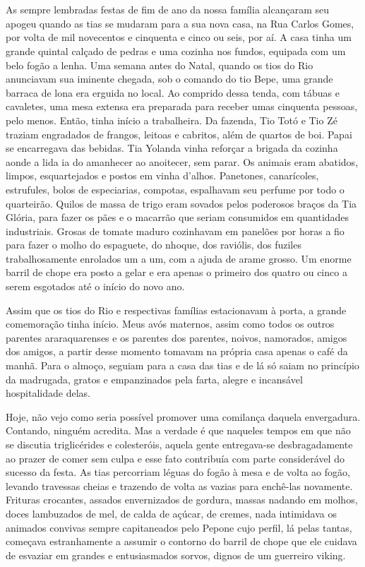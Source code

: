 \chapter{}
As sempre lembradas festas de fim de ano da nossa família alcançaram seu apogeu quando as tias se mudaram para a sua nova casa, na Rua Carlos Gomes, por volta de mil novecentos e cinquenta e cinco ou seis, por aí.
A casa tinha um grande quintal calçado de pedras e uma cozinha nos fundos, equipada com um belo fogão a lenha.
Uma semana antes do Natal, quando os tios do Rio anunciavam sua iminente chegada, sob o comando do tio Bepe, uma grande barraca de lona era erguida no local.
Ao comprido dessa tenda, com tábuas e cavaletes, uma mesa extensa era preparada para receber umas cinquenta pessoas, pelo menos.
Então, tinha início a trabalheira.
Da fazenda, Tio Totó e Tio Zé traziam engradados de frangos, leitoas e cabritos, além de quartos de boi.
Papai se encarregava das bebidas.
Tia Yolanda vinha reforçar a brigada da cozinha aonde a lida ia do amanhecer ao anoitecer, sem parar.
Os animais eram abatidos, limpos, esquartejados e postos em vinha d’alhos.
Panetones, canarícoles, estrufules, bolos de especiarias, compotas, espalhavam seu perfume por todo o quarteirão.
Quilos de massa de trigo eram sovados pelos poderosos braços da Tia Glória, para fazer os pães e o macarrão que seriam consumidos em quantidades industriais.
Grosas de tomate maduro cozinhavam em panelões por horas a fio para fazer o molho do espaguete, do nhoque, dos raviólis, dos fuziles trabalhosamente enrolados um a um, com a ajuda de arame grosso.
Um enorme barril de chope era posto a gelar e era apenas o primeiro dos quatro ou cinco a serem esgotados até o início do novo ano.

Assim que os tios do Rio e respectivas famílias estacionavam à porta, a grande comemoração tinha início.
Meus avós maternos, assim como todos os outros parentes araraquarenses e os parentes dos parentes, noivos, namorados, amigos dos amigos, a partir desse momento tomavam na própria casa apenas o café da manhã.
Para o almoço, seguiam para a casa das tias e de lá só saiam no princípio da madrugada, gratos e empanzinados pela farta, alegre e incansável hospitalidade delas.

Hoje, não vejo como seria possível promover uma comilança daquela envergadura.
Contando, ninguém acredita.
Mas a verdade é que naqueles tempos em que não se discutia triglicérides e colesteróis, aquela gente entregava-se desbragadamente ao prazer de comer sem culpa e esse fato contribuía com parte considerável do sucesso da festa.
As tias percorriam léguas do fogão à mesa e de volta ao fogão, levando travessas cheias e trazendo de volta as vazias para enchê-las novamente.
Frituras crocantes, assados envernizados de gordura, massas nadando em molhos, doces lambuzados de mel, de calda de açúcar, de cremes, nada intimidava os animados convivas sempre capitaneados pelo Pepone cujo perfil, lá pelas tantas, começava estranhamente a assumir o contorno do barril de chope que ele cuidava de esvaziar em grandes e entusiasmados sorvos, dignos de um guerreiro viking.


